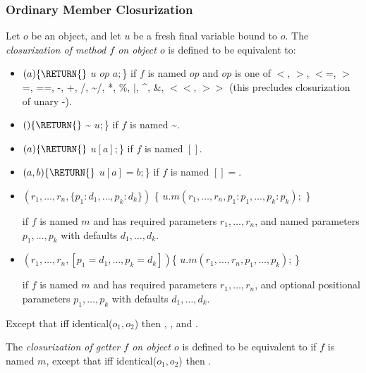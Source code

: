 \documentclass{article}
\newcommand{\code}[1]{{\sf #1}}
\begin{document}
\subsubsection{Ordinary Member Closurization}


\LMHash{}
Let $o$ be an object, and let $u$ be a fresh final variable bound to $o$.
The {\em closurization of method $f$ on object $o$} is defined to be equivalent to:
\begin{itemize}
\item $(a) \{\RETURN{}$ $u$ $op$ $a;$\} if $f$ is named $op$ and $op$ is one of  \code{$<$, $>$, $<$=, $>$=, ==,  -, +, /, \~{}/, *, \%, $|$, \^{}, \&, $<<$, $>>$} (this precludes closurization of unary -).
\item $() \{\RETURN{}$ \~{} $u;$\} if $f$ is named \~{}.
\item $(a) \{\RETURN{}$ $u[a];$\} if $f$ is named $[]$.
\item $(a, b) \{\RETURN{}$ $u[a] = b;$\} if $f$ is named $[]=$.
\item  
\begin{dartCode}
$(r_1, \ldots, r_n, \{p_1 : d_1, \ldots , p_k : d_k\})$ \{
  \RETURN{} $ u.m(r_1, \ldots, r_n, p_1: p_1, \ldots, p_k: p_k);$
\} 
\end{dartCode}
if $f$ is named $m$ and has required parameters $r_1, \ldots, r_n$, and named parameters $p_1, \ldots, p_k$ with defaults $d_1, \ldots, d_k$.
\item 
\begin{dartCode}
$(r_1, \ldots, r_n, [p_1 = d_1, \ldots , p_k = d_k])$\{
  \RETURN{} $u.m(r_1, \ldots, r_n, p_1, \ldots, p_k)$;
\}
\end{dartCode}

if $f$ is named $m$ and has required parameters $r_1, \ldots, r_n$, and optional positional parameters $p_1, \ldots, p_k$ with defaults $d_1, \ldots, d_k$.
\end{itemize}

\LMHash{}
Except that iff  \code{identical($o_1, o_2$)}  then  ,  ,  and  .

\LMHash{}
The {\em closurization of getter $f$ on object $o$} is defined to be equivalent to  if $f$ is named $m$, except that iff  \code{identical($o_1, o_2$)} then  .
\end{document}
